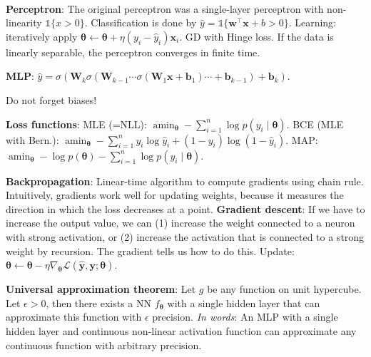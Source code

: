 \documentclass{article}
\DeclareMathOperator*{\argmin}{amin}
\newcommand{\lft}{\mathopen{}\mathclose\bgroup\left}
\newcommand{\rgt}{\aftergroup\egroup\right}
\renewcommand{\vec}[1]{\bm{#1}}
\newcommand{\mat}[1]{\bm{#1}}
\newenvironment{topic}[1]
{\textbf{\sffamily \colorbox{black}{\rlap{\textbf{\textcolor{white}{#1}}}\hspace{\linewidth}\hspace{-2\fboxsep}}} \\ \vspace{0.2cm}}
{}
\begin{document}
\begin{multicols*}{2}
\begin{itemize}
    \end{itemize}


    \begin{topic}{Neural networks}

        \textbf{Perceptron}: The original perceptron was a single-layer perceptron with non-linearity
        $\mathds{1}\{ x > 0 \}$. Classification is done by $\hat{y} = \mathds{1}\{ \vec{w}^\top
            \vec{x} + b > 0 \}$. Learning: iteratively apply $\vec{\theta} \gets
            \vec{\theta} + \eta(y_i - \hat{y}_i) \vec{x}_i$. GD with Hinge loss.
        If the data is linearly separable, the perceptron converges in finite time.

        \textbf{MLP}: $\hat{y} = \sigma (\mat{W}_k \sigma( \mat{W}_{k-1} \cdots \sigma( \mat{W}_1 \vec{x} + \vec{b}_1 ) \cdots + \vec{b}_{k-1} ) + \vec{b}_k )$.

        Do not forget biases!

        \textbf{Loss functions}: MLE (=NLL): $\argmin_{\vec{\theta}} - \sum_{i=1}^{n} \log p(y_i \mid \vec{\theta})$.
        BCE (MLE with Bern.): $\argmin_{\vec{\theta}} - \sum_{i=1}^{n} y_i \log \hat{y}_i + (1-y_i) \log (1 - \hat{y}_i)$.
        MAP: $\argmin_{\vec{\theta}} - \log p(\vec{\theta}) - \sum_{i=1}^{n} \log p(y_i \mid \vec{\theta})$.

        \textbf{Backpropagation}: Linear-time algorithm to compute gradients using chain rule.
        Intuitively, gradients work well for updating weights, because it measures the direction in
        which the loss decreases at a point. \textbf{Gradient descent}: If we have to increase the
        output value, we can (1) increase the weight connected to a neuron with strong activation, or
        (2) increase the activation that is connected to a strong weight by recursion. The gradient
        tells us how to do this. Update: $\vec{\theta} \gets \vec{\theta} - \eta \nabla_{\vec{\theta}} \mathcal{L}(\hat{\vec{y}}, \vec{y}; \vec{\theta})$.

        \textbf{Universal approximation theorem}: Let $g$ be any function on unit hypercube. Let
        $\epsilon > 0$, then there exists a NN $f_{\vec{\theta}}$ with a single hidden layer that can
        approximate this function with $\epsilon$ precision. \textit{In words}: An MLP with a single
        hidden layer and continuous non-linear activation function can approximate any continuous
        function with arbitrary precision.


\end{topic}
\end{multicols*}
\end{document}
